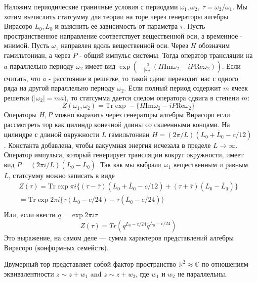Наложим периодические граничные условия с периодами $\omega_1, \omega_2,\; \tau=\omega_2/\omega_1$. 
Мы хотим вычислить статсумму для теории на торе через генераторы алгебры Вирасоро $L_0,\bar L_0$ и
выяснить ее зависимость от параметра $\tau$. Пусть пространственное направление соответствует
вещественной оси, а временное - мнимой. Пусть $\omega_1$ направлен вдоль вещественной оси. Через $H$
обозначим гамильтониан, а через $P$ - общий импульс системы. Тогда оператор трансляции на $a$
параллельно периоду $\omega_2$ имеет вид $\exp(-\frac{a}{|\omega_2|}(H \mathrm{Im} \omega_2-i P \mathrm{Re} \omega_2))$. 
Если считать, что $a$ - расстояние в решетке, то такой сдвиг переводит нас с одного ряда на другой
параллельно периоду $\omega_2$. Если полный период содержит $m$ ячеек решетки ($|\omega_2|=ma$), то
статсумма дается следом оператора сдвига в степени $m$:
\begin{equation}
  \label{eq:6}
  Z(\omega_1,\omega_2)=\mathrm{Tr} \exp-\{H \mathrm{Im} \omega_2-iP\mathrm{Re}\omega_2\}
\end{equation}
Операторы $H,P$ можно выразить через генераторы алгебры Вирасоро если рассмотреть тор как цилиндр
конечной длины со склеенными концами. На цилиндре с длиной окружности $L$ гамильтониан
$H=(2\pi/L)(L_0+\bar L_0-c/12)$. Константа добавлена, чтобы вакуумная энергия исчезала в пределе
$L\to \infty$. Оператор импульса, который генерирует трансляции вокруг окружности, имеет вид
$P=(2\pi i/L)(L_0-\bar L_0)$. Так как мы выбрали $\omega_1$ вещественным и равным $L$, статсумму
можно записать в виде
\begin{equation}
  \label{eq:7}
  \begin{split}
      Z(\tau)=\mathrm{Tr}\exp \pi i \{(\tau-\bar \tau)(L_0+\bar L_0-c/12)+(\tau+\bar \tau)(L_0-\bar
      L_0)\}\\
      =\mathrm{Tr} \exp 2 \pi i \{\tau(L_0-c/24)-\bar\tau (\bar L_0-c/24)\}\\
  \end{split}
\end{equation}
Или, если ввести $q=\exp 2\pi i \tau$
\begin{equation}
  \label{eq:71}
  Z(\tau)=Tr \left (q^{L_0-c/24}\bar{q}^{\bar{L}_0-c/24}\right)
\end{equation}
Это выражение, на самом деле --- сумма характеров представлений алгебры Вирасоро (конформных семейств).

Двумерный тор представляет собой фактор пространство $\mathbb{R}^2\approx \mathbb{C}$ по отношениям
эквивалентности $z\sim z+w_1$ and $z\sim z+w_2$, где $w_1$ и $w_2$ не параллельны.

